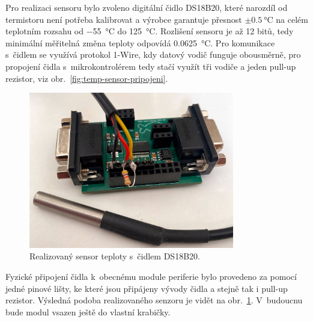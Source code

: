         Pro realizaci sensoru bylo zvoleno digitální čidlo DS18B20, které narozdíl od termistoru není potřeba kalibrovat a výrobce garantuje přesnost \(\pm \qty{0.5}{\degreeCelsius}\) na celém teplotním rozsahu od \qty{-55}{\degreeCelsius} do \qty{+125}{\degreeCelsius}. Rozlišení sensoru je až 12 bitů, tedy minimální měřitelná změna teploty odpovídá \qty{0.0625}{\degreeCelsius}. Pro komunikace s~čidlem se využívá protokol 1-Wire, kdy datový vodič funguje obousměrně, pro propojení čidla s~mikrokontrolérem tedy stačí využít tři vodiče a jeden pull-up rezistor, viz obr.~\ref{fig:temp-sensor-pripojeni}. 

        \begin{figure}[h!]
            \centering
            \includegraphics[width=0.8\textwidth]{obrazky/foto/sensor_teploty.jpeg}
            \caption{Realizovaný sensor teploty s~čidlem DS18B20.}
            \label{fig:obrazky-foto-sensor_teploty}
        \end{figure}
        
        
        Fyzické připojení čidla k~obecnému module periferie bylo provedeno za pomocí jedné pinové lišty, ke které jsou připájeny vývody čidla a stejně tak i pull-up rezistor. Výsledná podoba realizovaného senzoru je vidět na obr.~\ref{fig:obrazky-foto-sensor_teploty}. V~budoucnu bude modul vsazen ještě do vlastní krabičky.